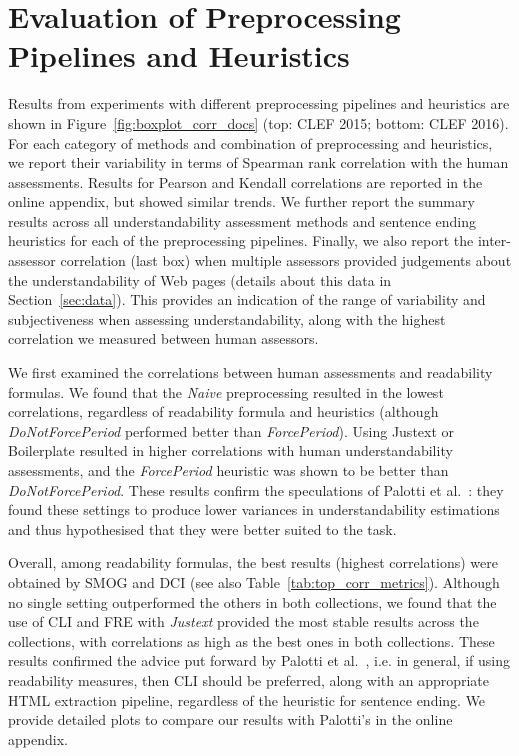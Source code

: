 \section*{Evaluation of Preprocessing Pipelines and Heuristics}
\label{sec:which_preprocessing}

Results from experiments with different preprocessing pipelines and heuristics are shown in Figure~\ref{fig:boxplot_corr_docs} (top: CLEF 2015; bottom: CLEF 2016). 
For each category of methods and combination of preprocessing and heuristics, we report their variability in terms of Spearman rank correlation with the human assessments. Results for Pearson and Kendall correlations are reported in the online appendix, but showed similar trends. 
We further report the summary results across all understandability assessment methods and sentence ending heuristics for each of the preprocessing pipelines. 
Finally, we also report the inter-assessor correlation (last box) when multiple assessors provided judgements about the understandability of Web pages (details about this data in Section~\ref{sec:data}). This provides an indication of the range of variability and subjectiveness when assessing understandability, along with the highest correlation we measured between human assessors. 


We first examined the correlations between human assessments and readability formulas. We found that the \textit{Naive} preprocessing resulted in the lowest correlations, regardless of readability formula and heuristics (although \textit{DoNotForcePeriod} performed better than \textit{ForcePeriod}). Using Justext or Boilerplate resulted in higher correlations with human understandability assessments, and the \textit{ForcePeriod} heuristic was shown to be better than \textit{DoNotForcePeriod}. These results confirm the speculations of Palotti et al.~\cite{palotti15}: they found these settings to produce lower variances in understandability estimations and thus hypothesised that they were better suited to the task.

Overall, among readability formulas, the best results (highest correlations) were obtained by SMOG and DCI (see also Table~\ref{tab:top_corr_metrics}). Although no single setting outperformed the others in both collections, we found that the use of CLI and FRE with \textit{Justext} provided the most stable results across the collections, with correlations as high as the best ones in both collections.
These results confirmed the advice put forward by Palotti et al.~\cite{palotti15}, i.e. in general, if using readability measures, then CLI should be preferred, along with an appropriate HTML extraction pipeline, regardless of the heuristic for sentence ending. We provide detailed plots to compare our results with Palotti's in the online appendix.

